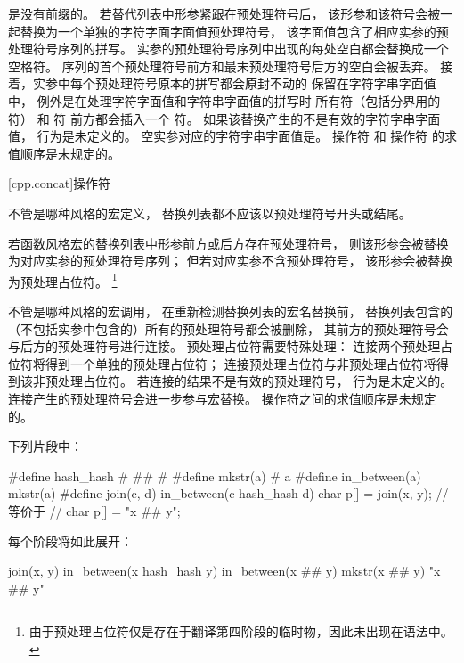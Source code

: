 \pnum
{}是没有前缀的。
若替代列表中形参紧跟在预处理符号\tcode{\#}后，
该形参和该\tcode{\#}符号会被一起替换为一个单独的字符字面字面值预处理符号，
该字面值包含了相应实参的预处理符号序列的拼写。
实参的预处理符号序列中出现的每处空白都会替换成一个空格符。
序列的首个预处理符号前方和最末预处理符号后方的空白会被丢弃。
接着，实参中每个预处理符号原本的拼写都会原封不动的
保留在字符字串字面值中，
例外是在处理字符字面值和字符串字面值的拼写时
所有符（包括分界用的符）
和
\tcode{\textbackslash}符
前方都会插入一个
\tcode{\textbackslash}符。
如果该替换产生的不是有效的字符字串字面值，
行为是未定义的。
空实参对应的字符字串字面值是。
\tcode{\#}操作符
和
\tcode{\#\#}操作符
的求值顺序是未规定的。

[cpp.concat]{\tcode{\#\#}操作符}%
%

\pnum
不管是哪种风格的宏定义，
替换列表都不应该以预处理符号\tcode{\#\#}开头或结尾。

\pnum
若函数风格宏的替换列表中形参前方或后方存在预处理符号\tcode{\#\#}，
则该形参会被替换为对应实参的预处理符号序列；
但若对应实参不含预处理符号，
该形参会被替换为预处理占位符。
\footnote{由于预处理占位符仅是存在于翻译第四阶段的临时物，因此未出现在语法中。}

\pnum
不管是哪种风格的宏调用，
在重新检测替换列表的宏名替换前，
替换列表包含的（不包括实参中包含的）所有的\tcode{\#\#}预处理符号都会被删除，
其前方的预处理符号会与后方的预处理符号进行连接。
预处理占位符需要特殊处理：
连接两个预处理占位符将得到一个单独的预处理占位符；
连接预处理占位符与非预处理占位符将得到该非预处理占位符。
若连接的结果不是有效的预处理符号，
行为是未定义的。
连接产生的预处理符号会进一步参与宏替换。
\tcode{\#\#}操作符之间的求值顺序是未规定的。

\enterexample 下列片段中：

\begin{codeblock}
#define hash_hash # ## #
#define mkstr(a) # a
#define in_between(a) mkstr(a)
#define join(c, d) in_between(c hash_hash d)
char p[] = join(x, y);          // 等价于
                                // char p[] = "x \#\# y";
\end{codeblock}

每个阶段将如此展开：

\begin{codeblock}
join(x, y)
in_between(x hash_hash y)
in_between(x ## y)
mkstr(x ## y)
"x ## y"
\end{codeblock}

